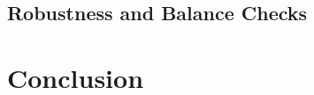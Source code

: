 \documentclass{scrartcl}
\begin{document}
\begin{center}
\footnotesize 
\end{center}{}
\begin{center}
\footnotesize 
\end{center}{}
\begin{center}
\footnotesize 
\end{center}{}
\subsection{Robustness and Balance Checks}

\section{Conclusion}



\end{document}
